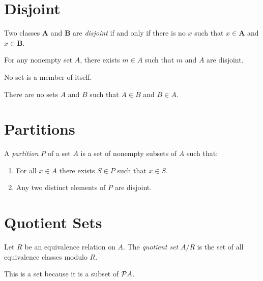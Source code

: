 \section{Disjoint}

\begin{definition}[Disjoint]
    Two classes $\mathbf{A}$ and $\mathbf{B}$ are \emph{disjoint} if and only if there is no $x$
    such that $x \in \mathbf{A}$ and $x \in \mathbf{B}$.
\end{definition}

\begin{axiom}[Regularity]
    For any nonempty set $A$, there exists $m \in A$ such that $m$ and $A$ are disjoint.
\end{axiom}

\begin{theorem}[Regularity]
    No set is a member of itself.
\end{theorem}

\begin{theorem}[Regularity]
    There are no sets $A$ and $B$ such that $A \in B$ and $B \in A$.
\end{theorem}

\section{Partitions}

\begin{definition}[Partition]
    A \emph{partition} $P$ of a set $A$ is a set of nonempty subsets of $A$ such that:
    \begin{enumerate}
        \item For all $x \in A$ there exists $S \in P$ such that $x \in S$.
        \item Any two distinct elements of $P$ are disjoint.
    \end{enumerate}
\end{definition}

\section{Quotient Sets}

\begin{definition}
    Let $R$ be an equivalence relation on $A$. The \emph{quotient set} $A / R$
    is the set of all equivalence classes modulo $R$.

    This is a set because it is a subset of $\mathcal{P} A$.
\end{definition}

